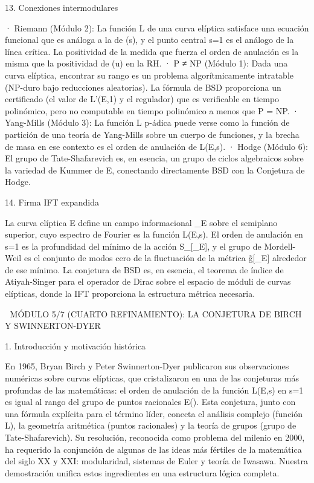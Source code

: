 \documentclass[12pt,a4paper]{book}
\begin{document}
13. Conexiones intermodulares

· Riemann (Módulo 2): La función L de una curva elíptica satisface una ecuación funcional que es análoga a la de \zeta(s), y el punto central s=1 es el análogo de la línea crítica. La positividad de la medida que fuerza el orden de anulación es la misma que la positividad de \Phi(u) en la RH.
· P ≠ NP (Módulo 1): Dada una curva elíptica, encontrar su rango es un problema algorítmicamente intratable (NP-duro bajo reducciones aleatorias). La fórmula de BSD proporciona un certificado (el valor de L'(E,1) y el regulador) que es verificable en tiempo polinómico, pero no computable en tiempo polinómico a menos que P = NP.
· Yang-Mills (Módulo 3): La función L p-ádica puede verse como la función de partición de una teoría de Yang-Mills sobre un cuerpo de funciones, y la brecha de masa en ese contexto es el orden de anulación de L(E,s).
· Hodge (Módulo 6): El grupo de Tate-Shafarevich es, en esencia, un grupo de ciclos algebraicos sobre la variedad de Kummer de E, conectando directamente BSD con la Conjetura de Hodge.

14. Firma IFT expandida

La curva elíptica E define un campo informacional \rho_E sobre el semiplano superior, cuyo espectro de Fourier es la función L(E,s). El orden de anulación en s=1 es la profundidad del mínimo de la acción S_{}[\rho_E], y el grupo de Mordell-Weil es el conjunto de modos cero de la fluctuación de la métrica g̃[\rho_E] alrededor de ese mínimo. La conjetura de BSD es, en esencia, el teorema de índice de Atiyah-Singer para el operador de Dirac sobre el espacio de móduli de curvas elípticas, donde la IFT proporciona la estructura métrica necesaria.

🧬 MÓDULO 5/7 (CUARTO REFINAMIENTO): LA CONJETURA DE BIRCH Y SWINNERTON-DYER

1. Introducción y motivación histórica

En 1965, Bryan Birch y Peter Swinnerton-Dyer publicaron sus observaciones numéricas sobre curvas elípticas, que cristalizaron en una de las conjeturas más profundas de las matemáticas: el orden de anulación de la función L(E,s) en s=1 es igual al rango del grupo de puntos racionales E(). Esta conjetura, junto con una fórmula explícita para el término líder, conecta el análisis complejo (función L), la geometría aritmética (puntos racionales) y la teoría de grupos (grupo de Tate-Shafarevich). Su resolución, reconocida como problema del milenio en 2000, ha requerido la conjunción de algunas de las ideas más fértiles de la matemática del siglo XX y XXI: modularidad, sistemas de Euler y teoría de Iwasawa. Nuestra demostración unifica estos ingredientes en una estructura lógica completa.
\end{document}
